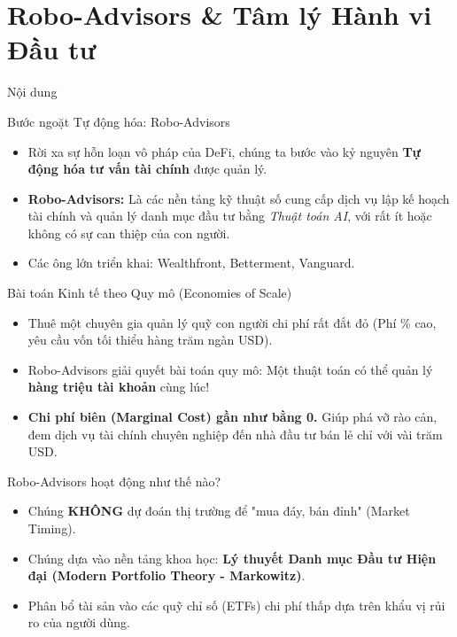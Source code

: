 \documentclass[aspectratio=169, 12pt]{beamer}
\begin{document}
\section{Robo-Advisors \& Tâm lý Hành vi Đầu tư}

\begin{frame}{Nội dung}
    \tableofcontents[currentsection]
\end{frame}

\begin{frame}{Bước ngoặt Tự động hóa: Robo-Advisors}
    \begin{itemize}
        \item Rời xa sự hỗn loạn vô pháp của DeFi, chúng ta bước vào kỷ nguyên \textbf{Tự động hóa tư vấn tài chính} được quản lý.
        \item \textbf{Robo-Advisors:} Là các nền tảng kỹ thuật số cung cấp dịch vụ lập kế hoạch tài chính và quản lý danh mục đầu tư bằng \textit{Thuật toán AI}, với rất ít hoặc không có sự can thiệp của con người.
        \item Các ông lớn triển khai: Wealthfront, Betterment, Vanguard.
    \end{itemize}
\end{frame}

\begin{frame}{Bài toán Kinh tế theo Quy mô (Economies of Scale)}
    \begin{itemize}
        \item Thuê một chuyên gia quản lý quỹ con người chi phí rất đắt đỏ (Phí \% cao, yêu cầu vốn tối thiểu hàng trăm ngàn USD).
        \item Robo-Advisors giải quyết bài toán quy mô: Một thuật toán có thể quản lý \textbf{hàng triệu tài khoản} cùng lúc!
        \item \textbf{Chi phí biên (Marginal Cost) gần như bằng 0.} Giúp phá vỡ rào cản, đem dịch vụ tài chính chuyên nghiệp đến nhà đầu tư bán lẻ chỉ với vài trăm USD.
    \end{itemize}
\end{frame}

\begin{frame}{Robo-Advisors hoạt động như thế nào?}
    \begin{itemize}
        \item Chúng \textbf{KHÔNG} dự đoán thị trường để "mua đáy, bán đỉnh" (Market Timing).
        \item Chúng dựa vào nền tảng khoa học: \textbf{Lý thuyết Danh mục Đầu tư Hiện đại (Modern Portfolio Theory - Markowitz)}.
        \item Phân bổ tài sản vào các quỹ chỉ số (ETFs) chi phí thấp dựa trên khẩu vị rủi ro của người dùng.
    \end{itemize}
\end{frame}
\end{document}
